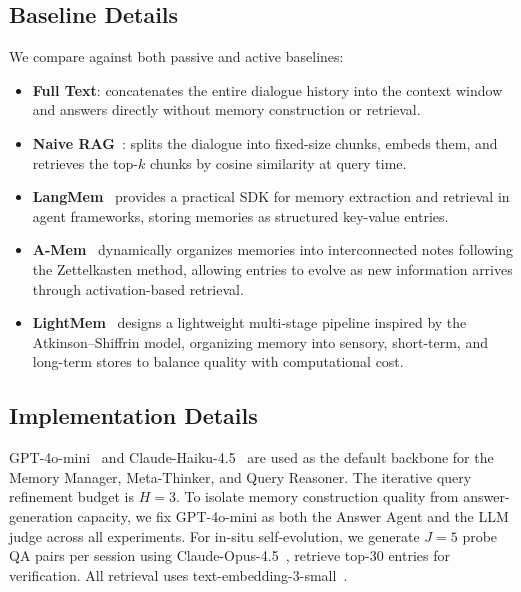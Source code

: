 \subsection{Baseline Details}
\label{appendix:baseline_details}
We compare \method against both passive and active baselines:
\begin{itemize}[leftmargin=*]
    \item \textbf{Full Text}: concatenates the entire dialogue history into the context window and answers directly without memory construction or retrieval.
    \item \textbf{Naive RAG}~\cite{gao2023retrieval}: splits the dialogue into fixed-size chunks, embeds them, and retrieves the top-$k$ chunks by cosine similarity at query time.
    \item \textbf{LangMem}~\cite{LangMemBlog} provides a practical SDK for memory extraction and retrieval in agent frameworks, storing memories as structured key-value entries.
\item \textbf{A-Mem}~\cite{xu2025mem} dynamically organizes memories into interconnected notes following the Zettelkasten method, allowing entries to evolve as new information arrives through activation-based retrieval.
\item \textbf{LightMem}~\cite{fang2025lightmem} designs a lightweight multi-stage pipeline inspired by the Atkinson--Shiffrin model, organizing memory into sensory, short-term, and long-term stores to balance quality with computational cost.

\end{itemize}

\subsection{Implementation Details}
\label{appendix:implementation_details}
GPT-4o-mini~\cite{gpt4ocard} and Claude-Haiku-4.5~\cite{anthropic2025claudehaiku45} 
are used as the default backbone for the Memory Manager, 
Meta-Thinker, and Query Reasoner.
The iterative query refinement budget is $H{=}3$.
To isolate memory construction quality from answer-generation 
capacity, we fix GPT-4o-mini as both the Answer Agent and the 
LLM judge across all experiments.
For in-situ self-evolution, we generate $J{=}5$ probe QA pairs 
per session using Claude-Opus-4.5~\cite{anthropic2025claudeopus45}, 
retrieve top-$30$ entries for verification.
All retrieval uses text-embedding-3-small~\cite{openai2024embedding3}.

